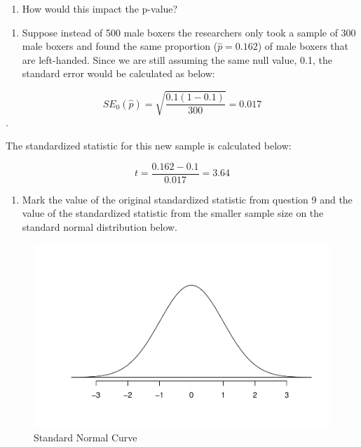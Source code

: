 \documentclass[
]{report}
\providecommand{\tightlist}{%
  \setlength{\itemsep}{0pt}\setlength{\parskip}{0pt}}
\begin{document}
\vspace{0.5in}

\begin{enumerate}
\def\labelenumi{\arabic{enumi}.}
\setcounter{enumi}{13}
\tightlist
\item
  How would this impact the p-value?
\end{enumerate}

\vspace{0.2in}

\begin{enumerate}
\def\labelenumi{\arabic{enumi}.}
\setcounter{enumi}{14}
\tightlist
\item
  Suppose instead of 500 male boxers the researchers only took a sample of 300 male boxers and found the same proportion (\(\hat{p}=0.162\)) of male boxers that are left-handed. Since we are still assuming the same null value, 0.1, the standard error would be calculated as below:
\end{enumerate}

\[SE_0(\hat{p})=\sqrt{\frac{0.1(1-0.1)}{300}} = 0.017\].

The standardized statistic for this new sample is calculated below:

\[t = \frac{0.162-0.1}{0.017} = 3.64\]

\begin{enumerate}
\def\labelenumi{\arabic{enumi}.}
\setcounter{enumi}{15}
\tightlist
\item
  Mark the value of the original standardized statistic from question 9 and the value of the standardized statistic from the smaller sample size on the standard normal distribution below.
\end{enumerate}

\begin{figure}

{\centering \includegraphics[width=0.5\linewidth]{04-A09-inference-1cat-theory_files/figure-latex/Norcur-1} 

}

\caption{Standard Normal Curve}\label{fig:Norcur}
\end{figure}
\end{document}
